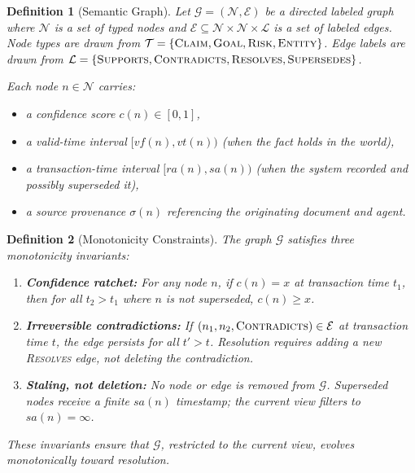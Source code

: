 \documentclass[11pt]{article}
\newtheorem{definition}{Definition}
\begin{document}
\begin{definition}[Semantic Graph]
\label{def:graph}
Let $\mathcal{G} = (\mathcal{N}, \mathcal{E})$ be a directed labeled graph where $\mathcal{N}$ is a set of typed nodes and $\mathcal{E} \subseteq \mathcal{N} \times \mathcal{N} \times \mathcal{L}$ is a set of labeled edges. Node types are drawn from $\mathcal{T} = \{\textnormal{\textsc{Claim}}, \textnormal{\textsc{Goal}}, \textnormal{\textsc{Risk}}, \textnormal{\textsc{Entity}}\}$. Edge labels are drawn from $\mathcal{L} = \{\textnormal{\textsc{Supports}}, \textnormal{\textsc{Contradicts}}, \textnormal{\textsc{Resolves}}, \textnormal{\textsc{Supersedes}}\}$.

Each node $n \in \mathcal{N}$ carries:
\begin{itemize}
  \item a confidence score $c(n) \in [0,1]$,
  \item a valid-time interval $[\textit{vf}(n), \textit{vt}(n))$ (when the fact holds in the world),
  \item a transaction-time interval $[\textit{ra}(n), \textit{sa}(n))$ (when the system recorded and possibly superseded it),
  \item a source provenance $\sigma(n)$ referencing the originating document and agent.
\end{itemize}
\end{definition}

\begin{definition}[Monotonicity Constraints]
\label{def:monotonicity}
The graph $\mathcal{G}$ satisfies three monotonicity invariants:
\begin{enumerate}
  \item \textbf{Confidence ratchet:} For any node $n$, if $c(n) = x$ at transaction time $t_1$, then for all $t_2 > t_1$ where $n$ is not superseded, $c(n) \geq x$.
  \item \textbf{Irreversible contradictions:} If $(n_1, n_2, \textnormal{\textsc{Contradicts}}) \in \mathcal{E}$ at transaction time $t$, the edge persists for all $t' > t$. Resolution requires adding a new \textnormal{\textsc{Resolves}} edge, not deleting the contradiction.
  \item \textbf{Staling, not deletion:} No node or edge is removed from $\mathcal{G}$. Superseded nodes receive a finite $\textit{sa}(n)$ timestamp; the current view filters to $\textit{sa}(n) = \infty$.
\end{enumerate}
These invariants ensure that $\mathcal{G}$, restricted to the current view, evolves monotonically toward resolution.
\end{definition}
\end{document}
